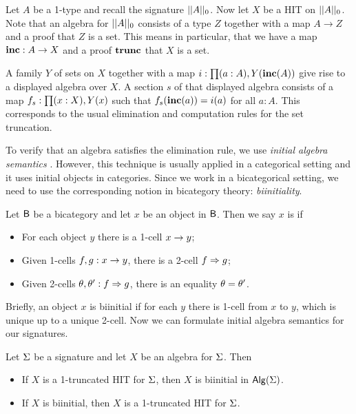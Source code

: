 \begin{example}
Let $A$ be a 1-type and recall the signature $|| A ||_0$.
Now let $X$ be a HIT on $|| A ||_0$.
Note that an algebra for $|| A ||_0$ consists of a type $Z$ together with a map $A \rightarrow Z$
and a proof that $Z$ is a set.
This means in particular, that we have a map $\operatorname{\mathbf{inc}} : A \rightarrow X$ and a proof $\operatorname{\mathbf{trunc}}$
that $X$ is a set.

A family $Y$ of sets on $X$ together with a map $i : \prod (a  : A) , Y(\operatorname{\mathbf{inc}}(A))$
give rise to a displayed algebra over $X$.
A section $s$ of that displayed algebra consists of a map $f_s : \prod (x : X) , Y(x)$
such that $f_s(\operatorname{\mathbf{inc}}(a)) = i(a)$ for all $a : A$.
This corresponds to the usual elimination and computation rules for the
set truncation.
\end{example}

To verify that an algebra satisfies the elimination rule, we use \emph{initial algebra semantics} \cite{hermida1998structural}.
However, this technique is usually applied in a categorical setting and it uses initial objects in categories.
Since we work in a bicategorical setting, we need to use the corresponding notion in bicategory theory: \emph{biinitiality}.

\begin{definition}
Let $\mathsf{B}$ be a bicategory and let $x$ be an object in $\mathsf{B}$.
Then we say $x$ is  if
\begin{itemize}
	\item For each object $y$ there is a 1-cell $x \rightarrow y$;
	\item Given 1-cells $f, g : x \rightarrow y$, there is a 2-cell $f \Rightarrow g$;
	\item Given 2-cells $\theta, \theta' : f \Rightarrow g$, there is an equality $\theta = \theta'$.
\end{itemize}
\end{definition}

Briefly, an object $x$ is biinitial if for each $y$ there is 1-cell from $x$ to $y$, which is unique up to a unique 2-cell.
Now we can formulate initial algebra semantics for our signatures.

\begin{proposition}
\label{thm:initial_alg_sem}
Let $\Sigma$ be a signature and let $X$ be an algebra for $\Sigma$.
Then
\begin{itemize}
	\item If $X$ is a 1-truncated HIT for $\Sigma$, then $X$ is biinitial in $\mathsf{Alg}(\Sigma)$.
	\item If $X$ is biinitial, then $X$ is a 1-truncated HIT for $\Sigma$.
\end{itemize}
\end{proposition}

